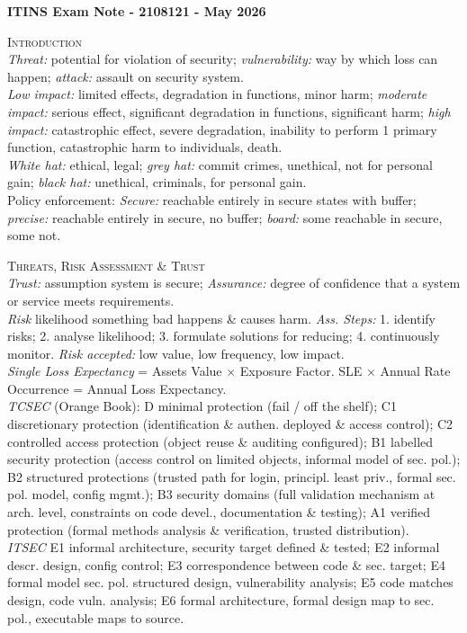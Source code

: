 \documentclass[a4paper, 9pt]{article}
\begin{document}
\textbf{ITINS Exam Note - 2108121 - May 2026}

\textsc{Introduction}\\
\textit{Threat:} potential for violation of security; \textit{vulnerability:} way by which loss can happen; \textit{attack:} assault on security system.\\
\textit{Low impact:} limited effects, degradation in functions, minor harm; \textit{moderate impact:} serious effect, significant degradation in functions, significant harm; \textit{high impact:} catastrophic effect, severe degradation, inability to perform 1 primary function, catastrophic harm to individuals, death.\\
\textit{White hat:} ethical, legal; \textit{grey hat:} commit crimes, unethical, not for personal gain; \textit{black hat:} unethical, criminals, for personal gain.\\
Policy enforcement: \textit{Secure:} reachable entirely in secure states with buffer; \textit{precise:} reachable entirely in secure, no buffer; \textit{board:} some reachable in secure, some not.

\textsc{Threats, Risk Assessment \& Trust}\\
\textit{Trust:}  assumption system is secure; \textit{Assurance:} degree of confidence that a system or service meets requirements. \\
\textit{Risk} likelihood something bad happens \& causes harm. \textit{Ass. Steps:} 1. identify risks; 2. analyse likelihood; 3. formulate solutions for reducing; 4. continuously monitor. \textit{Risk accepted:} low value, low frequency, low impact.\\
\textit{Single Loss Expectancy} = Assets Value $\times$ Exposure Factor. SLE $\times$ Annual Rate Occurrence = Annual Loss Expectancy.\\
\textit{TCSEC} (Orange Book): D minimal protection (fail / off the shelf); C1 discretionary protection (identification \& authen. deployed \& access control); C2 controlled access protection (object reuse \& auditing configured); B1 labelled security protection (access control on limited objects, informal model of sec. pol.); B2 structured protections (trusted path for login, principl. least priv., formal sec. pol. model, config mgmt.); B3 security domains (full validation mechanism at arch. level, constraints on code devel., documentation \& testing); A1 verified protection (formal methods analysis \& verification, trusted distribution).\\
\textit{ITSEC} E1 informal architecture, security target defined \& tested; E2 informal descr. design, config control; E3 correspondence between code \& sec. target; E4 formal model sec. pol. structured design, vulnerability analysis; E5 code matches design, code vuln. analysis; E6 formal architecture, formal design map to sec. pol., executable maps to source.
\end{document}
